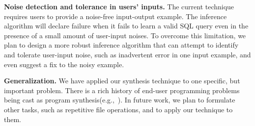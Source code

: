 \textbf{Noise detection and tolerance in users' inputs.} The current technique
requires users to provide a noise-free input-output example. The
inference algorithm will declare failure when it fails to learn a valid
SQL query even in the presence of a small amount of user-input noises.
To overcome this limitation, we plan to design a more robust inference
algorithm that can attempt to identify and tolerate user-input noise, such
as inadvertent error in one input example, and even suggest a fix to
the noisy example.



\textbf{Generalization.}
We have applied our synthesis technique to one specific, but
important problem.  There is a rich history of end-user programming
problems being cast as program synthesis(e.g.,~\cite{Gulwani:2010:DPS}).  In future
work, we plan to formulate other tasks, such as repetitive file operations, and to apply our technique 
to them.

